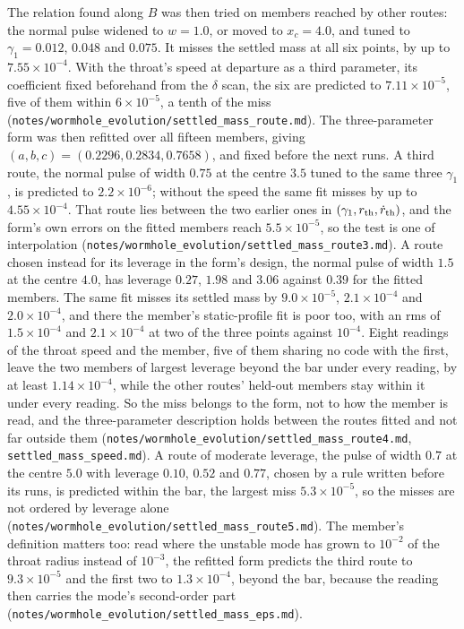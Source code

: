 \documentclass[11pt]{article}
\begin{document}
The relation found along $B$ was then tried on members reached by other routes: the normal pulse widened to $w=1.0$, or moved
to $x_c=4.0$, and tuned to $\gamma_1=0.012$, $0.048$ and $0.075$. It misses the settled mass at all six points, by up to
$7.55\times10^{-4}$. With the throat's speed at departure as a third parameter, its coefficient fixed beforehand from the
$\delta$ scan, the six are predicted to $7.11\times10^{-5}$, five of them within $6\times10^{-5}$, a tenth of the miss
(\texttt{notes/wormhole\_evolution/settled\_mass\_route.md}). The three-parameter form was then refitted over all fifteen members,
giving $(a,b,c)=(0.2296,0.2834,0.7658)$, and fixed before the next runs. A third route, the normal pulse of width $0.75$ at the
centre $3.5$ tuned to the same three $\gamma_1$, is predicted to $2.2\times10^{-6}$; without the speed the same fit misses by up to
$4.55\times10^{-4}$. That route lies between the two earlier ones in $(\gamma_1,r_{\rm th},\dot r_{\rm th})$, and the form's own
errors on the fitted members reach $5.5\times10^{-5}$, so the test is one of interpolation
(\texttt{notes/wormhole\_evolution/settled\_mass\_route3.md}). A route chosen instead for its leverage in the form's design, the
normal pulse of width $1.5$ at the centre $4.0$, has leverage $0.27$, $1.98$ and $3.06$ against $0.39$ for the fitted members. The
same fit misses its settled mass by $9.0\times10^{-5}$, $2.1\times10^{-4}$ and $2.0\times10^{-4}$, and there the member's static-profile
fit is poor too, with an rms of $1.5\times10^{-4}$ and $2.1\times10^{-4}$ at two of the three points against $10^{-4}$. Eight readings of
the throat speed and the member, five of them sharing no code with the first, leave the two members of largest leverage beyond the
bar under every reading, by at least $1.14\times10^{-4}$, while the other routes' held-out members stay within it under every
reading. So the miss belongs to the form, not to how the member is read, and the three-parameter description holds between
the routes fitted and not far outside them (\texttt{notes/wormhole\_evolution/settled\_mass\_route4.md},
\texttt{settled\_mass\_speed.md}). A route of moderate leverage,
the pulse of width $0.7$ at the centre $5.0$ with leverage $0.10$, $0.52$ and $0.77$, chosen by a rule written before its runs, is
predicted within the bar, the largest miss $5.3\times10^{-5}$, so the misses are not ordered by leverage alone
(\texttt{notes/wormhole\_evolution/settled\_mass\_route5.md}). The member's definition
matters too: read where the unstable mode has grown to $10^{-2}$ of the throat radius instead of $10^{-3}$, the refitted form
predicts the third route to $9.3\times10^{-5}$ and the first two to $1.3\times10^{-4}$, beyond the bar, because the reading then carries
the mode's second-order part (\texttt{notes/wormhole\_evolution/settled\_mass\_eps.md}).
\end{document}
